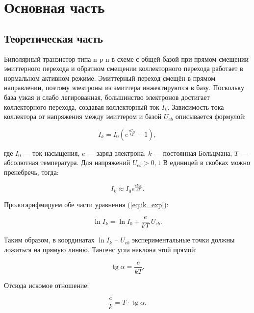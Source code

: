 \section{Основная часть}

\subsection{Теоретическая часть}

Биполярный транзистор типа n-p-n в схеме с общей базой при прямом смещении эмиттерного перехода и обратном смещении коллекторного перехода работает в нормальном активном режиме. Эмиттерный переход смещён в прямом направлении, поэтому электроны из эмиттера инжектируются в базу. Поскольку база узкая и слабо легированная, большинство электронов достигает коллекторного перехода, создавая коллекторный ток \(I_k\). Зависимость тока коллектора от напряжения между эмиттером и базой \(U_{eb}\) описывается формулой:

\begin{equation}
I_k = I_0 \left( e^{\frac{eU_{eb}}{kT}} - 1 \right),
\label{eq:ik_gen}
\end{equation}

где \(I_0\) — ток насыщения, \(e\) — заряд электрона, \(k\) — постоянная Больцмана, \(T\) — абсолютная температура. Для напряжений \(U_{eb} > 0{,}1\) В единицей в скобках можно пренебречь, тогда:

\begin{equation}
I_k \approx I_0 e^{\frac{eU_{eb}}{kT}}.
\label{eq:ik_exp}
\end{equation}

Прологарифмируем обе части уравнения (\ref{eq:ik_exp}):

\begin{equation}
\ln I_k = \ln I_0 + \frac{e}{kT}\,U_{eb}.
\label{eq:ln_ik}
\end{equation}

Таким образом, в координатах \(\ln I_k\) – \(U_{eb}\) экспериментальные точки должны ложиться на прямую линию. Тангенс угла наклона этой прямой:

\begin{equation}
\operatorname{tg}\alpha = \frac{e}{kT}.
\label{eq:tg}
\end{equation}

Отсюда искомое отношение:

\begin{equation}
\frac{e}{k} = T \cdot \operatorname{tg}\alpha.
\label{eq:ek}
\end{equation}

